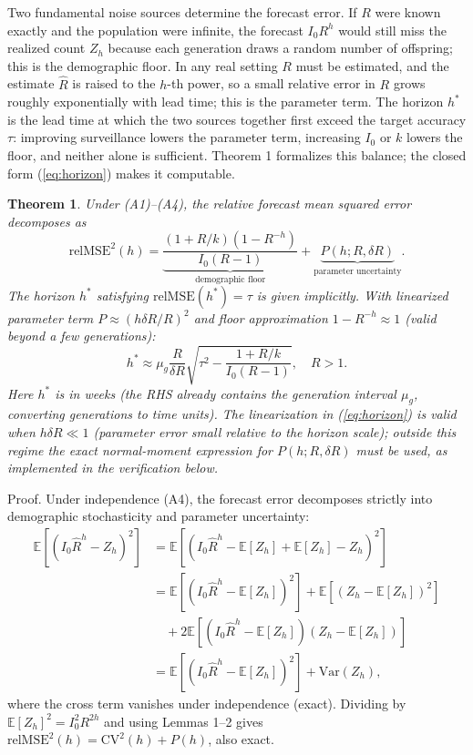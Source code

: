 \documentclass[review]{elsarticle}
\theoremstyle{plain}
\newtheorem{theorem}{Theorem}
\theoremstyle{definition}
\begin{document}
Two fundamental noise sources determine the forecast error. If $R$ were known exactly and the population were infinite, the forecast $I_0 R^h$ would still miss the realized count $Z_h$ because each generation draws a random number of offspring; this is the demographic floor. In any real setting $R$ must be estimated, and the estimate $\hat{R}$ is raised to the $h$-th power, so a small relative error in $R$ grows roughly exponentially with lead time; this is the parameter term. The horizon $h^*$ is the lead time at which the two sources together first exceed the target accuracy $\tau$: improving surveillance lowers the parameter term, increasing $I_0$ or $k$ lowers the floor, and neither alone is sufficient. Theorem 1 formalizes this balance; the closed form (\ref{eq:horizon}) makes it computable.

\begin{theorem}
Under (A1)--(A4), the relative forecast mean squared error decomposes as
\begin{equation}
\text{relMSE}^2(h) = \underbrace{\frac{(1+R/k)(1-R^{-h})}{I_0(R-1)}}_{\text{demographic floor}} + \underbrace{P(h; R, \delta R)}_{\text{parameter uncertainty}}.
\end{equation}
The horizon $h^*$ satisfying $\text{relMSE}(h^*) = \tau$ is given implicitly. With linearized parameter term $P \approx (h \delta R / R)^2$ and floor approximation $1 - R^{-h} \approx 1$ (valid beyond a few generations):
\begin{equation}
h^* \approx \mu_g \frac{R}{\delta R} \sqrt{\tau^2 - \frac{1+R/k}{I_0(R-1)}}, \quad R > 1.
\label{eq:horizon}
\end{equation}
Here $h^*$ is in weeks (the RHS already contains the generation interval $\mu_g$, converting generations to time units). The linearization in (\ref{eq:horizon}) is valid when $h \delta R \ll 1$ (parameter error small relative to the horizon scale); outside this regime the exact normal-moment expression for $P(h; R, \delta R)$ must be used, as implemented in the verification below.
\end{theorem}

Proof. Under independence (A4), the forecast error decomposes strictly into demographic stochasticity and parameter uncertainty:
\begin{align}
\mathbb{E}[(I_0 \hat{R}^h - Z_h)^2] &= \mathbb{E}[(I_0 \hat{R}^h - \mathbb{E}[Z_h] + \mathbb{E}[Z_h] - Z_h)^2] \\
&= \mathbb{E}[(I_0 \hat{R}^h - \mathbb{E}[Z_h])^2] + \mathbb{E}[(Z_h - \mathbb{E}[Z_h])^2] \\
&\quad + 2\mathbb{E}[(I_0 \hat{R}^h - \mathbb{E}[Z_h])(Z_h - \mathbb{E}[Z_h])] \\
&= \mathbb{E}[(I_0 \hat{R}^h - \mathbb{E}[Z_h])^2] + \text{Var}(Z_h),
\end{align}
where the cross term vanishes under independence (exact). Dividing by $\mathbb{E}[Z_h]^2 = I_0^2 R^{2h}$ and using Lemmas 1--2 gives $\text{relMSE}^2(h) = \text{CV}^2(h) + P(h)$, also exact.
\end{document}
